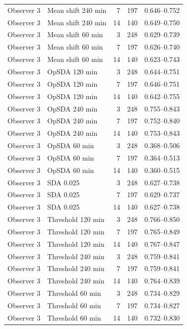 \documentclass[a4paper,11pt]{article}
\begin{document}
{\begin{longtable}[]{@{}llrrl@{}}
Observer 3 & Mean shift 240 min & 7 & 197 & 0.646--0.752 \\
Observer 3 & Mean shift 240 min & 14 & 140 & 0.649--0.750 \\
Observer 3 & Mean shift 60 min & 3 & 248 & 0.629--0.739 \\
Observer 3 & Mean shift 60 min & 7 & 197 & 0.626--0.740 \\
Observer 3 & Mean shift 60 min & 14 & 140 & 0.623--0.743 \\
Observer 3 & OpSDA 120 min & 3 & 248 & 0.644--0.751 \\
Observer 3 & OpSDA 120 min & 7 & 197 & 0.646--0.751 \\
Observer 3 & OpSDA 120 min & 14 & 140 & 0.642--0.755 \\
Observer 3 & OpSDA 240 min & 3 & 248 & 0.755--0.843 \\
Observer 3 & OpSDA 240 min & 7 & 197 & 0.752--0.840 \\
Observer 3 & OpSDA 240 min & 14 & 140 & 0.753--0.843 \\
Observer 3 & OpSDA 60 min & 3 & 248 & 0.368--0.506 \\
Observer 3 & OpSDA 60 min & 7 & 197 & 0.364--0.513 \\
Observer 3 & OpSDA 60 min & 14 & 140 & 0.360--0.515 \\
Observer 3 & SDA 0.025 & 3 & 248 & 0.627--0.738 \\
Observer 3 & SDA 0.025 & 7 & 197 & 0.629--0.737 \\
Observer 3 & SDA 0.025 & 14 & 140 & 0.627--0.738 \\
Observer 3 & Threshold 120 min & 3 & 248 & 0.766--0.850 \\
Observer 3 & Threshold 120 min & 7 & 197 & 0.765--0.849 \\
Observer 3 & Threshold 120 min & 14 & 140 & 0.767--0.847 \\
Observer 3 & Threshold 240 min & 3 & 248 & 0.759--0.841 \\
Observer 3 & Threshold 240 min & 7 & 197 & 0.759--0.841 \\
Observer 3 & Threshold 240 min & 14 & 140 & 0.764--0.839 \\
Observer 3 & Threshold 60 min & 3 & 248 & 0.734--0.829 \\
Observer 3 & Threshold 60 min & 7 & 197 & 0.734--0.827 \\
Observer 3 & Threshold 60 min & 14 & 140 & 0.732--0.830 \\
\end{longtable}
}
\end{document}
